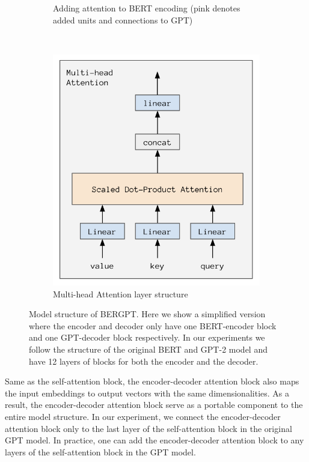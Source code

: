 \documentclass{article}
\begin{document}
\begin{figure}[h]
\begin{subfigure}[t]{0.5\textwidth}
        \caption{Adding attention to BERT encoding (pink denotes added units and connections to GPT)}
    \end{subfigure}%
    ~ 
    \begin{subfigure}[t]{0.5\textwidth}
        \centering
        \includegraphics[scale=0.55]{multi-head attention.png}
        \caption{Multi-head Attention layer structure}
        \label{multi-head}
    \end{subfigure}
    \caption{Model structure of BERGPT. Here we show a simplified version where the encoder and decoder only have one BERT-encoder block and one GPT-decoder block respectively. In our experiments we follow the structure of the original BERT and GPT-2 model and have 12 layers of blocks for both the encoder and the decoder.}
\end{figure}

Same as the self-attention block, the encoder-decoder attention block also maps the input embeddings to output vectors with the same dimensionalities. As a result, the encoder-decoder attention block serve as a portable component to the entire model structure. In our experiment, we connect the encoder-decoder attention block only to the last layer of the self-attention block in the original GPT model. In practice, one can add the encoder-decoder attention block to any layers of the self-attention block in the GPT model. 
\end{document}
